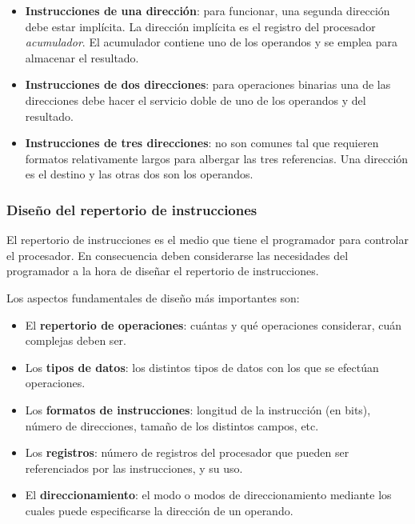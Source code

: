 \begin{subs}
  \begin{itemize}
    \item \textbf{Instrucciones de una dirección}: para funcionar, una segunda dirección debe estar implícita. La dirección implícita es el registro del procesador \textit{acumulador}. El acumulador contiene uno de los operandos y se emplea para almacenar el resultado.
    \item \textbf{Instrucciones de dos direcciones}: para operaciones binarias una de las direcciones debe hacer el servicio doble de uno de los operandos y del resultado.
    \item \textbf{Instrucciones de tres direcciones}: no son comunes tal que requieren formatos relativamente largos para albergar las tres referencias. Una dirección es el destino y las otras dos son los operandos.
  \end{itemize}

  \subsubsection{Diseño del repertorio de instrucciones}

  El repertorio de instrucciones es el medio que tiene el programador para controlar el procesador. En consecuencia deben considerarse las necesidades del programador a la hora de diseñar el repertorio de instrucciones.

  Los aspectos fundamentales de diseño más importantes son:

  \begin{itemize}
    \item El \textbf{repertorio de operaciones}: cuántas y qué operaciones considerar, cuán complejas deben ser.
    \item Los \textbf{tipos de datos}: los distintos tipos de datos con los que se efectúan operaciones.
    \item Los \textbf{formatos de instrucciones}: longitud de la instrucción (en bits), número de direcciones, tamaño de los distintos campos, etc.
    \item Los \textbf{registros}: número de registros del procesador que pueden ser referenciados por las instrucciones, y su uso.
    \item El \textbf{direccionamiento}: el modo o modos de direccionamiento mediante los cuales puede especificarse la dirección de un operando.
  \end{itemize}

\end{subs}

